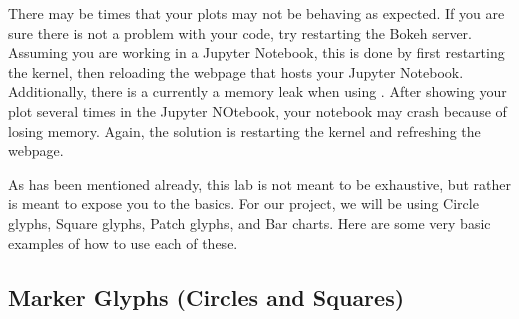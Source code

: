 \begin{info}
    There may be times that your plots
    may not be behaving as expected. If you are sure there is not a problem with
    your code, try restarting the Bokeh server. Assuming you are working in
    a Jupyter Notebook, this is done by first restarting the kernel, then
    reloading the webpage that hosts your Jupyter Notebook. Additionally, there
    is a currently a memory leak when using . After
    showing your plot several times in the Jupyter NOtebook, your notebook may
    crash because of losing memory. Again, the solution is restarting the kernel
    and refreshing the webpage.
\end{info}

As has been mentioned already, this lab is not meant to be exhaustive, but
rather is meant to expose you to the basics. For our project, we will be using
Circle glyphs, Square glyphs, Patch glyphs, and Bar charts. Here are some very
basic examples of how to use each of these.

\subsection*{Marker Glyphs (Circles and Squares)}

